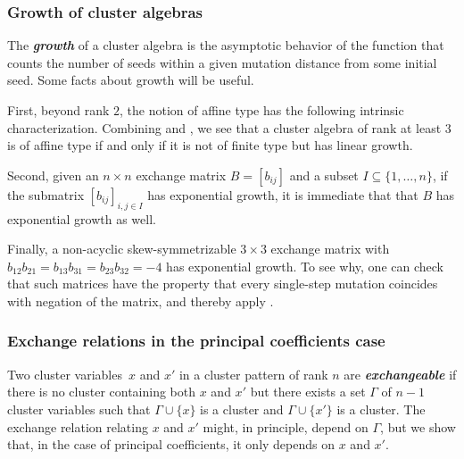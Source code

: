 \documentclass{amsart}
\theoremstyle{definition}
\theoremstyle{remark}
\numberwithin{equation}{section}
\newcommand{\newword}[1]{\textbf{\emph{#1}}}
\newcommand{\set}[1]{{\lbrace #1 \rbrace}}
\newcommand{\0}{{\mathbf{0}}}
\begin{document}
\subsubsection{Growth of cluster algebras}\label{growth sec}
The \newword{growth} of a cluster algebra is the asymptotic behavior of the function that counts the number of seeds within a given mutation distance from some initial seed.
Some facts about growth will be useful.

First, beyond rank $2$, the notion of affine type has the following intrinsic characterization.
Combining \cite[Theorem~3.5]{Seven} and \cite[Theorem~1.1]{FeShThTu12}, we see that a cluster algebra of rank at least $3$ is of affine type if and only if it is not of finite type but has linear growth.

Second, given an $n\times n$ exchange matrix $B=[b_{ij}]$ and a subset $I\subseteq\set{1,\ldots,n}$, if the submatrix $[b_{ij}]_{i,j\in I}$ has exponential growth, it is immediate that that $B$ has exponential growth as well.

Finally, a non-acyclic skew-symmetrizable $3\times3$ exchange matrix with $b_{12}b_{21}=b_{13}b_{31}=b_{23}b_{32}=-4$ has exponential growth.
To see why, one can check that such matrices have the property that every single-step mutation coincides with negation of the matrix, and thereby apply \cite[Theorem~1.1]{FeShThTu12}.

\subsubsection{Exchange relations in the principal coefficients case}\label{exch rel sec}
Two cluster variables~$x$ and $x'$ in a cluster pattern of rank $n$  are \newword{exchangeable} if there is no cluster containing both $x$ and $x'$ but there exists a set $\Gamma$ of $n-1$ cluster variables such that $\Gamma\cup\set{x}$ is a cluster and $\Gamma\cup\set{x'}$ is a cluster.
The exchange relation relating $x$ and $x'$ might, in principle, depend on $\Gamma$, but we show that, in the case of principal coefficients, it only depends on $x$ and $x'$.
\end{document}
